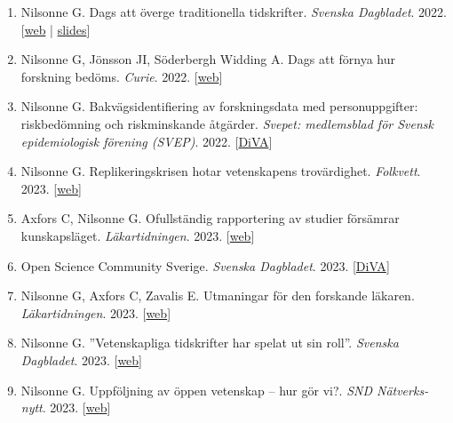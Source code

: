 \documentclass[10pt,a4paper,twocolumn]{article}
\begin{document}
\begin{enumerate}
    \item Nilsonne G. Dags att överge traditionella tidskrifter. \textit{Svenska Dagbladet}. 2022. [\href{https://www.svd.se/a/eEr1JK/gustav-nilsonne-dags-att-overge-traditionella-tidskrifter}{web} | \href{https://osf.io/8t2cz/}{slides}]

    \item Nilsonne G, Jönsson JI, Söderbergh Widding A. Dags att förnya hur forskning bedöms. \textit{Curie}. 2022. [\href{https://www.tidningencurie.se/debatt/dags-att-fornya-hur-forskning-bedoms}{web}]

    \item Nilsonne G. Bakvägsidentifiering av forskningsdata med personuppgifter: riskbedömning och riskminskande åtgärder. \textit{Svepet: medlemsblad för Svensk epidemiologisk förening (SVEP)}. 2022. [\href{http://www.diva-portal.org/smash/record.jsf?pid=diva2%3A1673731}{DiVA}]

    \item Nilsonne G. Replikeringskrisen hotar vetenskapens trovärdighet. \textit{Folkvett}. 2023. [\href{https://www.vof.se/wp-content/uploads/2023/05/3-replikeringskrisen.pdf}{web}]

    \item Axfors C, Nilsonne G. Ofullständig rapportering av studier försämrar kunskapsläget. \textit{Läkartidningen}. 2023. [\href{https://lakartidningen.se/opinion/debatt/2023/03/ofullstandig-rapportering-av-studier-forsamrar-kunskapslaget}{web}]

    \item Open Science Community Sverige. \textit{Svenska Dagbladet}. 2023. [\href{https://www.diva-portal.org/smash/record.jsf?pid=diva2%3A1746618}{DiVA}]

    \item Nilsonne G, Axfors C, Zavalis E. Utmaningar för den forskande läkaren. \textit{Läkartidningen}. 2023. [\href{https://lakartidningen.se/klinik-och-vetenskap-1/artiklar-1/temainledning/2023/05/utmaningar-for-den-forskande-lakaren/}{web}]

    \item Nilsonne G. ”Vetenskapliga tidskrifter har spelat ut sin roll”. \textit{Svenska Dagbladet}. 2023. [\href{https://www.svd.se/a/Kn2da5/de-vetenskapliga-tidskrifterna-har-spelat-ut-sin-roll-skriver-gustav-nilsonne}{web}]

    \item Nilsonne G. Uppföljning av öppen vetenskap – hur gör vi?. \textit{SND Nätverks-nytt}. 2023. [\href{https://www.anpdm.com/article/4340584A7644435E41724642514071/32864910/7424591}{web}]


\end{enumerate}
\end{document}
